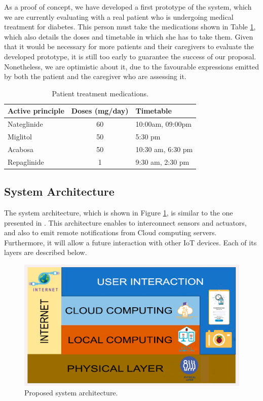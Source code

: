 \documentclass{IOS-Book-Article}
\begin{document}
As a proof of concept, we have developed a first prototype of the system, which we are currently evaluating with a real patient who is undergoing medical treatment for diabetes. This person must take the medications shown in Table \ref{tables:medications}, which also details the doses and timetable in which she has to take them. Given that it would be necessary for more patients and their caregivers to evaluate the developed prototype, it is still too early to guarantee the success of our proposal.  Nonetheless, we are optimistic about it, due to the favourable expressions emitted by both the patient and the caregiver who are assessing it.

\begin{table}[htbp]
	\begin{center}
		\caption {Patient treatment medications.}
		\label{tables:medications}
		\begin{tabular}{lcl}
			\hline
			\textbf{Active principle}    & 	\textbf{Doses (mg/day)}  & \textbf{Timetable} \\
			\hline
			Nateglinide & 	60	&	10:00am, 09:00pm\\
			Miglitol 	&	50	&	5:30 pm \\
			Acabosa		&	50 	&	10:30 am, 6:30 pm \\
			Repaglinide	&	1	&	9:30 am, 2:30 pm \\
			\hline
		\end{tabular}
	\end{center}
\end{table}

\subsection{System Architecture}

The system architecture, which is shown in Figure \ref{figures:architecture}, is similar to the one presented in \cite{r5}. This architecture enables to interconnect sensors and actuators, and also to emit remote notifications from Cloud computing servers. Furthermore, it will allow a future interaction with other IoT devices. Each of its layers are described below.

\begin{figure}[htbp]
	\centering\includegraphics{Architecture.png}
	\caption{Proposed system architecture.}
	\label{figures:architecture}
\end{figure}
\end{document}

